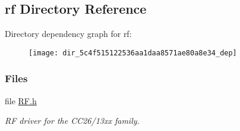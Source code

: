 \subsection{rf Directory Reference}
\label{dir_5c4f515122536aa1daa8571ae80a8e34}
Directory dependency graph for rf\+:
\nopagebreak
\begin{figure}[H]
\begin{center}
\leavevmode
\texttt{[image: dir\_5c4f515122536aa1daa8571ae80a8e34\_dep]}
\end{center}
\end{figure}
\subsubsection*{Files}
\begin{DoxyCompactItemize}
\item 
file \hyperlink{_r_f_8h}{R\+F.\+h}
\begin{DoxyCompactList}\small\item\em R\+F driver for the C\+C26/13xx family. \end{DoxyCompactList}\end{DoxyCompactItemize}
